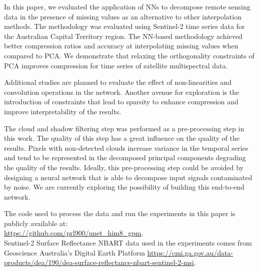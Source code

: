 \documentclass[essd, manuscript]{copernicus}
\begin{document}
\conclusions  %
In this paper, we evaluated the application of NNs to decompose remote sensing data in the presence of missing values as an alternative to other interpolation methods. The methodology was evaluated using Sentinel-2 time series data for the Australian Capital Territory region. The NN-based methodology achieved better compression ratios and accuracy at interpolating missing values when compared to PCA. We demonstrate that relaxing the orthogonality constraints of PCA improves compression for time series of satellite multispectral data.

Additional studies are planned to evaluate the effect of non-linearities and convolution operations in the network. Another avenue for exploration is the introduction of constraints that lead to sparsity to enhance compression and improve interpretability of the results. 

The cloud and shadow filtering step was performed as a pre-processing step in this work. The quality of this step has a great influence on the quality of the results. Pixels with non-detected clouds increase variance in the temporal series and tend to be represented in the decomposed principal components degrading the quality of the results. Ideally, this pre-processing step could be avoided by designing a neural network that is able to decompose input signals contaminated by noise. We are currently exploring the possibility of building this end-to-end network.






\codedataavailability{} 
The code used to process the data and run the experiments in this paper is publicly available at: \\
\href{https://github.com/prl900/unet_him8_gpm}{https://github.com/prl900/unet\_him8\_gpm}. \\
Sentinel-2 Surface Reflectance NBART data used in the experiments comes from Geoscience Australia's Digital Earth Platform \href{https://cmi.ga.gov.au/data-products/dea/190/dea-surface-reflectance-nbart-sentinel-2-msi}{https://cmi.ga.gov.au/data-products/dea/190/dea-surface-reflectance-nbart-sentinel-2-msi}. 
\end{document}
